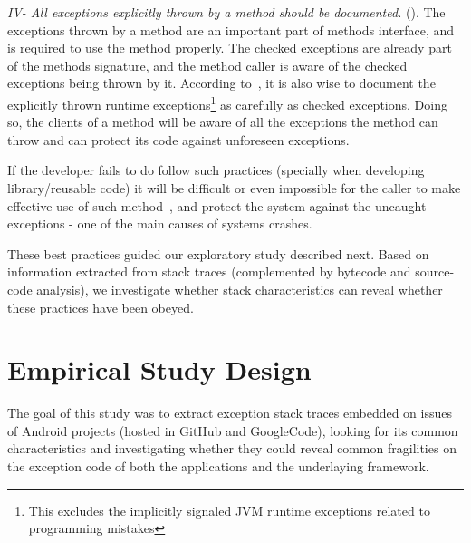 \documentclass[conference]{IEEEtran}
\begin{document}

\emph{IV- All exceptions explicitly thrown by a method should be documented.}
(\cite{mandrioli1992advances,gosling2000java,wirfs2006toward,bloch2008effective}).
The exceptions thrown by a method are an important part of methods interface,
and is required to use the method properly. The checked exceptions are already
part of the  methods signature, and the method caller is aware of the checked
exceptions being thrown by it. According to~\cite{bloch2008effective}, it is
also wise to document the explicitly thrown runtime exceptions\footnote{This
excludes the implicitly signaled JVM runtime exceptions related to programming
mistakes} as carefully as checked exceptions. Doing so, the clients of a method
will be aware of all the exceptions the method can throw and can protect its code
against unforeseen exceptions. 

If the developer fails to do follow such practices (specially when developing 
library/reusable code) it will be difficult or even impossible for the caller to 
make effective use of such method~\cite{wirfs2006toward, bloch2008effective},
and protect the system against the uncaught exceptions - one of the main causes of 
systems crashes. 

These best practices guided our exploratory study described next.
Based on information extracted from stack traces (complemented by
bytecode and source-code analysis), we investigate whether stack characteristics
can reveal whether these practices have been obeyed.



\section{Empirical Study Design}


The goal of this study was to extract exception stack traces embedded on issues of Android projects 
(hosted in GitHub and GoogleCode), looking for its 
common characteristics and investigating whether
 they could reveal common fragilities on the exception code of both the 
applications and the underlaying  framework. 
\end{document}
